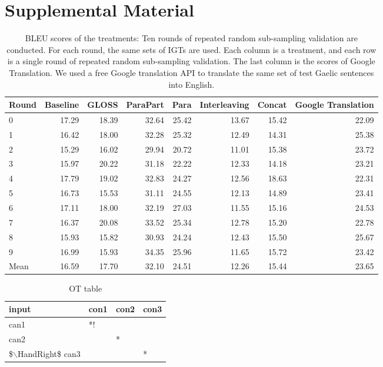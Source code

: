 \documentclass[11pt,a4paper]{article}
\begin{document}
\section{Supplemental Material}
\begin{table}[ht]
\centering
\begin{tabular}{lrrrrrrr}
  \hline
Round & Baseline & GLOSS & ParaPart & Para & Interleaving & Concat & Google Translation \\ 
  \hline
0 & 17.29 & 18.39 & 32.64 & 25.42 & 13.67 & 15.42 & 22.09 \\ 
  1 & 16.42 & 18.00 & 32.28 & 25.32 & 12.49 & 14.31 & 25.38 \\ 
  2 & 15.29 & 16.02 & 29.94 & 20.72 & 11.01 & 15.38 & 23.72 \\ 
  3 & 15.97 & 20.22 & 31.18 & 22.22 & 12.33 & 14.18 & 23.21 \\ 
  4 & 17.79 & 19.02 & 32.83 & 24.27 & 12.56 & 18.63 & 22.31 \\ 
  5 & 16.73 & 15.53 & 31.11 & 24.55 & 12.13 & 14.89 & 23.41 \\ 
  6 & 17.11 & 18.00 & 32.19 & 27.03 & 11.55 & 15.16 & 24.53 \\ 
  7 & 16.37 & 20.08 & 33.52 & 25.34 & 12.78 & 15.20 & 22.78 \\ 
  8 & 15.93 & 15.82 & 30.93 & 24.24 & 12.43 & 15.50 & 25.67 \\ 
  9 & 16.99 & 15.93 & 34.35 & 25.96 & 11.65 & 15.72 & 23.42 \\ 
   \hline
Mean & 16.59 & 17.70 & 32.10 & 24.51 & 12.26 & 15.44 & 23.65 \\ 
   \hline
\end{tabular}
\caption{BLEU scores of the treatments: Ten rounds of repeated random sub-sampling validation are conducted. For each round, the same sets of IGTs are used. Each column is a treatment, and each row is a single round of repeated random sub-sampling validation. The last column is the scores of Google Translation. We used a free Google translation API \citep{google_api} to translate the same set of test Gaelic sentences into English.} 
\label{table:complete_table}
\end{table}%
\begin{table}[ht]
\centering
\begin{tabular}{llll}
  \hline
input & con1 & con2 & con3 \\ 
  \hline
can1 & *! &  &  \\ 
  can2 &  & * &  \\ 
  \$$\backslash$HandRight\$ can3 &  &  & * \\ 
   \hline
\end{tabular}
\caption{OT table} 
\end{table}
\end{document}
